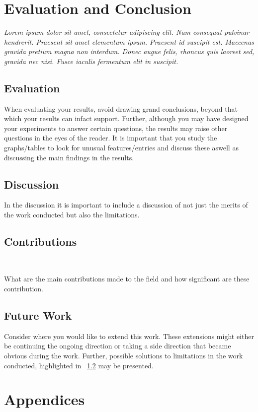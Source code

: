 \documentclass[a4paper]{book}
\begin{document}
\chapter{Evaluation and Conclusion}
\label{cha:evaluationAndConclusion}

{\it Lorem ipsum dolor sit amet, consectetur adipiscing elit. Nam consequat pulvinar hendrerit. Praesent sit amet elementum ipsum. Praesent id suscipit est. Maecenas gravida pretium magna non interdum. Donec augue felis, rhoncus quis laoreet sed, gravida nec nisi. Fusce iaculis fermentum elit in suscipit. }

\section{Evaluation}
\label{sec:Evaluation}

When evaluating your results, avoid drawing grand conclusions, beyond that which your results can infact support. Further, although you may have designed your experiments to answer certain questions, the results may raise other questions in the eyes of the reader. It is important that you study the graphs/tables to look for unusual features/entries and discuss these aswell as discussing the main findings in the results. 

\section{Discussion}
\label{sec:Discussion}

In the discussion it is important to include a discussion of not just the merits of the work conducted but also the limitations. 

\section{Contributions}~\label{cont}
\label{sec:Contributions}

What are the main contributions made to the field and how significant are these contribution.  

\section{Future Work}
\label{sec:futureWork}

Consider where you would like to extend this work. These extensions might either be continuing the ongoing direction or taking a side direction that became obvious during the work. Further, possible solutions to limitations in the work conducted, highlighted in ~\ref{sec:Discussion} may be presented. 

\backmatter



\chapter{Appendices}
\label{cha:appendices}
\end{document}
